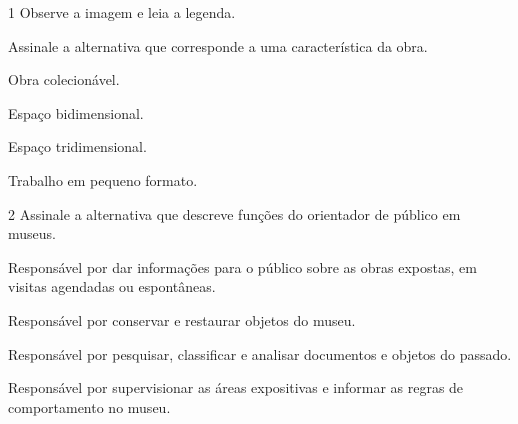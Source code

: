 

\num{1} Observe a imagem e leia a legenda.


Assinale a alternativa que corresponde a uma característica da obra.

\begin{minipage}{.5\textwidth}
\begin{escolha}
\item
  Obra colecionável.
\item
  Espaço bidimensional.
\item
  Espaço tridimensional.
\item
  Trabalho em pequeno formato.
\end{escolha}
\end{minipage}

\num{2} Assinale a alternativa que descreve funções do orientador de público em museus.

\begin{escolha}
\item
  Responsável por dar informações para o público sobre as obras
  expostas, em visitas agendadas ou espontâneas.
\item
  Responsável por conservar e restaurar objetos do museu.
\item
  Responsável por pesquisar, classificar e analisar documentos e objetos
  do passado.
\item
  Responsável por supervisionar as áreas expositivas e informar as
  regras de comportamento no museu.
\end{escolha}


